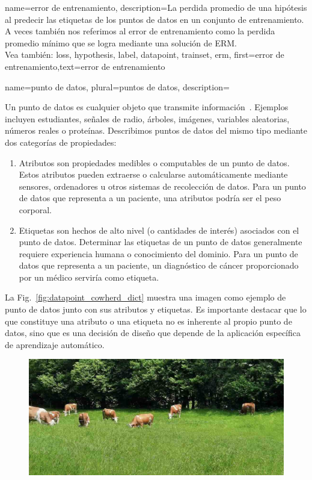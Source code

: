  {
	 name={error de entrenamiento},
	 description={La perdida promedio de una hipótesis al 
		 predecir las etiquetas de los puntos de datos en un conjunto de entrenamiento. 
		 A veces también nos referimos al error de entrenamiento como la perdida promedio mínimo 
		 que se logra mediante una solución de ERM.
		 \\
	 	Vea también: \gls{loss}, \gls{hypothesis}, \gls{label}, \gls{datapoint}, \gls{trainset}, \gls{erm}},
		 first={error de entrenamiento},text={error de entrenamiento}  
 }

{name={punto de datos}, plural={puntos de datos},
description={Un punto de datos es cualquier objeto que transmite información~\cite{coverthomas}. 
		Ejemplos incluyen estudiantes, señales de radio, árboles, imágenes, variables aleatorias, números reales 
		o proteínas. Describimos puntos de datos del mismo tipo mediante dos categorías de propiedades:
		\begin{enumerate}[label=\arabic*)]
			\item Atributos son propiedades medibles o computables de un punto de datos. 
			Estos atributos pueden extraerse o calcularse automáticamente mediante sensores, ordenadores u otros 
			sistemas de recolección de datos. Para un punto de datos que representa a un paciente, 
			una atributos podría ser el peso corporal.
			\item Etiquetas son hechos de alto nivel (o cantidades de interés) asociados con el punto de datos. 
			Determinar las etiquetas de un punto de datos generalmente requiere experiencia humana o conocimiento del dominio. 
			Para un punto de datos que representa a un paciente, un diagnóstico de cáncer proporcionado por un médico 
			serviría como etiqueta.
		\end{enumerate}
		La Fig.\ \ref{fig:datapoint_cowherd_dict} muestra una imagen como ejemplo de punto de datos
		junto con sus atributos y etiquetas. Es importante destacar que lo que constituye una 
		atributo o una etiqueta no es inherente al propio punto de datos, sino que es una 
		decisión de diseño que depende de la aplicación específica de aprendizaje automático.
		\begin{figure}[H]
    		\centering
    			\begin{minipage}[t]{0.95\textwidth}
        			\centering
        			\includegraphics[width=\textwidth]{../../assets/CowsAustria.jpg}

\end{minipage}
\end{figure}}}
